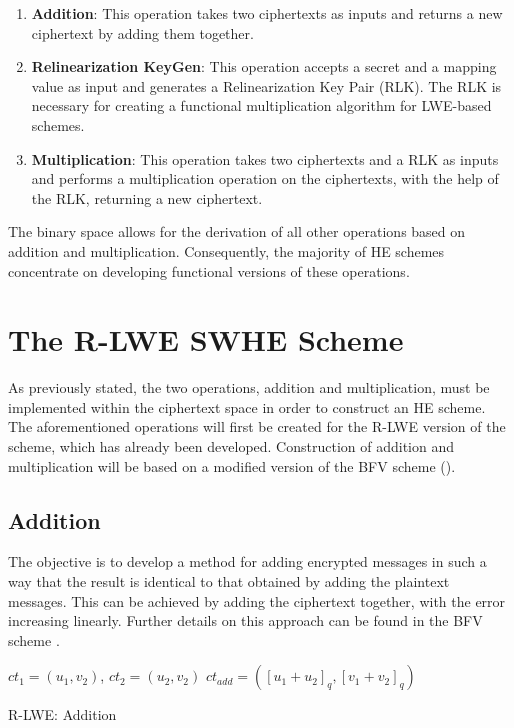 \begin{enumerate}
  \item \textbf{Addition}: This operation takes two ciphertexts as inputs and returns a new ciphertext by adding them together.
  \item \textbf{Relinearization KeyGen}: This operation accepts a secret and a mapping value as input and generates a Relinearization Key Pair (RLK). The RLK is necessary for creating a functional multiplication algorithm for LWE-based schemes.
  \item \textbf{Multiplication}: This operation takes two ciphertexts and a RLK as inputs and performs a multiplication operation on the ciphertexts, with the help of the RLK, returning a new ciphertext.
\end{enumerate}

The binary space allows for the derivation of all other operations based on addition and multiplication. Consequently, the majority of HE schemes concentrate on developing functional versions of these operations.


\section{The R-LWE SWHE Scheme}

As previously stated, the two operations, addition and multiplication, must be implemented within the ciphertext space in order to construct an HE scheme. The aforementioned operations will first be created for the R-LWE version of the scheme, which has already been developed. Construction of addition and multiplication will be based on a modified version of the BFV scheme (\cite{bfv}).

\subsection*{Addition}

The objective is to develop a method for adding encrypted messages in such a way that the result is identical to that obtained by adding the plaintext messages. This can be achieved by adding the ciphertext together, with the error increasing linearly. Further details on this approach can be found in the BFV scheme \cite{bfv}. 

\begin{algorithm}[htb]
  \begin{algorithmic}[1]
    \REQUIRE $ct_1 = (u_1, v_2)$, $ct_2 = (u_2, v_2)$
    \RETURN $ct_{add} = ([u_1 + u_2]_q, [v_1 + v_2]_q)$
  \end{algorithmic}
  \caption{R-LWE: Addition}
  \label{alg:RlweAddition}
\end{algorithm}

